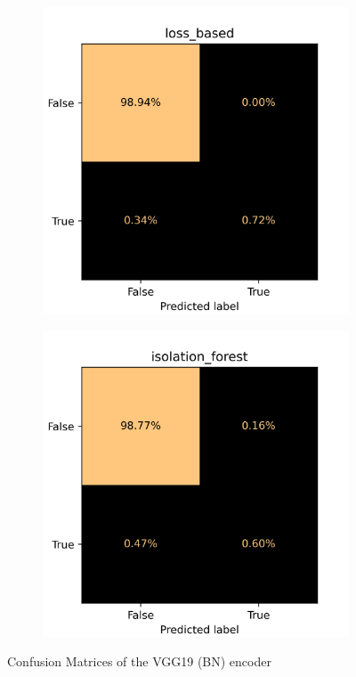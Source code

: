 \begin{figure}[!ht]
    \centering
    \begin{subfigure}{0.4\textwidth}
        \centering
        \includegraphics[width=\textwidth]{./results/vgg19_bn_vgg19/20230525_045131_loss_based_cm.png}
    \end{subfigure}
    \begin{subfigure}{0.4\textwidth}
        \centering
        \includegraphics[width=\textwidth]{./results/vgg19_bn_vgg19/20230525_045131_isolation_forest_cm.png}
    \end{subfigure}
    \caption{Confusion Matrices of the VGG19 (BN) encoder}
    \label{fig:vgg19_bn_cm}
\end{figure}